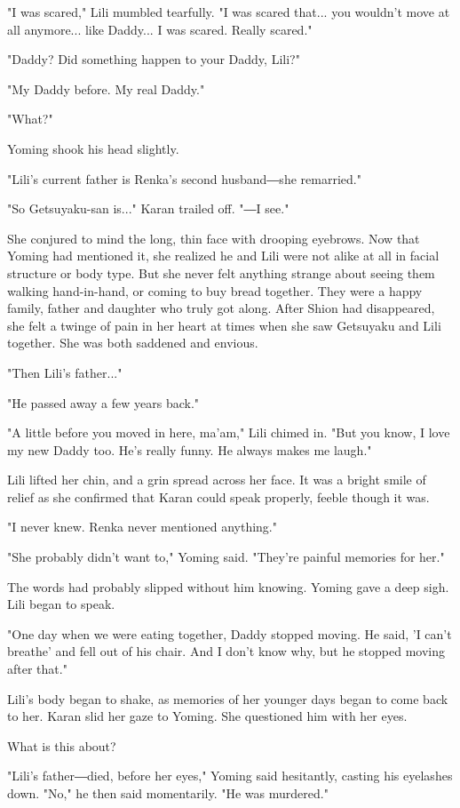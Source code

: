 "I was scared," Lili mumbled tearfully. "I was scared that... you
wouldn't move at all anymore... like Daddy... I was scared. Really
scared."

"Daddy? Did something happen to your Daddy, Lili?"

"My Daddy before. My real Daddy."

"What?"

Yoming shook his head slightly.

"Lili's current father is Renka's second husband―she remarried."

"So Getsuyaku-san is..." Karan trailed off. "―I see."

She conjured to mind the long, thin face with drooping eyebrows. Now
that Yoming had mentioned it, she realized he and Lili were not alike at
all in facial structure or body type. But she never felt anything
strange about seeing them walking hand-in-hand, or coming to buy bread
together. They were a happy family, father and daughter who truly got
along. After Shion had disappeared, she felt a twinge of pain in her
heart at times when she saw Getsuyaku and Lili together. She was both
saddened and envious.

"Then Lili's father..."

"He passed away a few years back."

"A little before you moved in here, ma'am," Lili chimed in. "But you
know, I love my new Daddy too. He's really funny. He always makes me
laugh."

Lili lifted her chin, and a grin spread across her face. It was a bright
smile of relief as she confirmed that Karan could speak properly, feeble
though it was.

"I never knew. Renka never mentioned anything."

"She probably didn't want to," Yoming said. "They're painful memories
for her."

The words had probably slipped without him knowing. Yoming gave a deep
sigh. Lili began to speak.

"One day when we were eating together, Daddy stopped moving. He said, 'I
can't breathe' and fell out of his chair. And I don't know why, but he
stopped moving after that."

Lili's body began to shake, as memories of her younger days began to
come back to her. Karan slid her gaze to Yoming. She questioned him with
her eyes.

What is this about?

"Lili's father―died, before her eyes," Yoming said hesitantly, casting
his eyelashes down. "No," he then said momentarily. "He was murdered."

